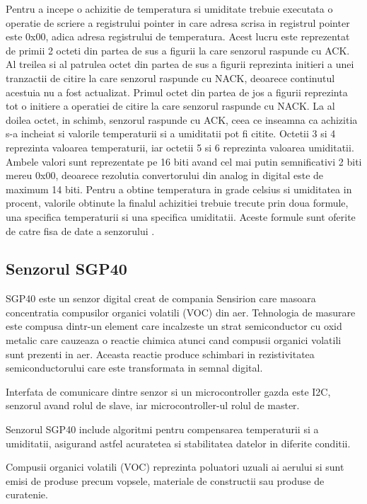Pentru a incepe o achizitie de temperatura si umiditate trebuie executata o operatie de scriere a registrului pointer in care adresa scrisa in registrul pointer este 
0x00, adica adresa registrului de temperatura. Acest lucru este reprezentat de primii 2 octeti din partea de sus a figurii la care senzorul raspunde cu ACK. Al treilea 
si al patrulea octet din partea de sus a figurii reprezinta initieri a unei tranzactii de citire la care senzorul raspunde cu NACK, deoarece continutul acestuia nu a 
fost actualizat. Primul octet din partea de jos a figurii reprezinta tot o initiere a operatiei de citire la care senzorul raspunde cu NACK. La al doilea octet, in schimb, 
senzorul raspunde cu ACK, ceea ce inseamna ca achizitia s-a incheiat si valorile temperaturii si a umiditatii pot fi citite. Octetii 3 si 4 reprezinta valoarea 
temperaturii, iar octetii 5 si 6 reprezinta valoarea umiditatii. Ambele valori sunt reprezentate pe 16 biti avand cel mai putin semnificativi 2 biti mereu 0x00, 
deoarece rezolutia convertorului din analog in digital este de maximum 14 biti. Pentru a obtine temperatura in grade celsius si umiditatea in procent, valorile 
obtinute la finalul achizitiei trebuie trecute prin doua formule, una specifica temperaturii si una specifica umiditatii. Aceste formule sunt oferite de catre 
fisa de date a senzorului \cite{hdc1080}.

\subsection{Senzorul SGP40}\label{subsec:af_sgp40}
SGP40 este un senzor digital creat de compania Sensirion care masoara concentratia compusilor organici volatili (VOC) din aer. Tehnologia de masurare este compusa 
dintr-un element care incalzeste un strat semiconductor cu oxid metalic care cauzeaza o reactie chimica atunci cand compusii organici volatili sunt prezenti in aer. 
Aceasta reactie produce schimbari in rezistivitatea semiconductorului care este transformata in semnal digital.

Interfata de comunicare dintre senzor si un microcontroller gazda este I2C, senzorul avand rolul de slave, iar microcontroller-ul rolul de master.

Senzorul SGP40 include algoritmi pentru compensarea temperaturii si a umiditatii, asigurand astfel acuratetea si stabilitatea datelor in diferite conditii.

Compusii organici volatili (VOC) reprezinta poluatori uzuali ai aerului si sunt emisi de produse precum vopsele, materiale de constructii sau produse de curatenie.

